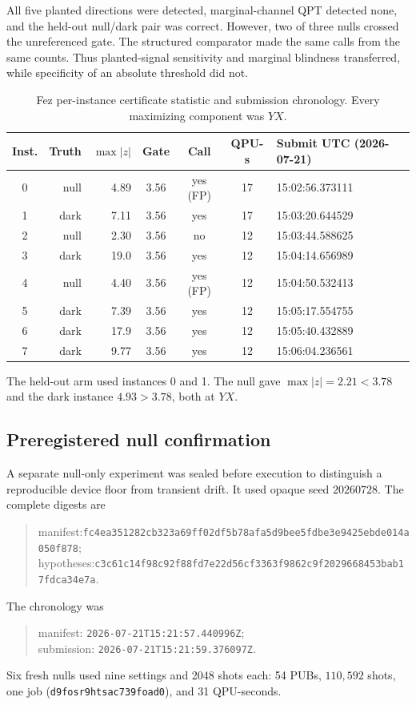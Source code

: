 \documentclass[aps,prl,onecolumn,superscriptaddress,nofootinbib]{revtex4-2}
\newcommand{\hashfour}[4]{\texttt{#1}\allowbreak\texttt{#2}\allowbreak\texttt{#3}\allowbreak\texttt{#4}}
\begin{document}
All five planted directions were detected, marginal-channel QPT detected none, and the held-out null/dark pair was correct.  However, two of three nulls crossed the unreferenced gate.  The structured comparator made the same calls from the same counts.  Thus planted-signal sensitivity and marginal blindness transferred, while specificity of an absolute threshold did not.

\begin{table}[t]
\caption{Fez per-instance certificate statistic and submission chronology.  Every maximizing component was $YX$.}
\label{tab:fez-instances}
\scriptsize
\begin{ruledtabular}
\begin{tabular}{crrcccl}
Inst. & Truth & $\max|z|$ & Gate & Call & QPU-s & Submit UTC (2026-07-21)\\
\hline
0 & null & 4.89 & 3.56 & yes (FP) & 17 & 15:02:56.373111\\
1 & dark & 7.11 & 3.56 & yes & 17 & 15:03:20.644529\\
2 & null & 2.30 & 3.56 & no & 12 & 15:03:44.588625\\
3 & dark & 19.0 & 3.56 & yes & 12 & 15:04:14.656989\\
4 & null & 4.40 & 3.56 & yes (FP) & 12 & 15:04:50.532413\\
5 & dark & 7.39 & 3.56 & yes & 12 & 15:05:17.554755\\
6 & dark & 17.9 & 3.56 & yes & 12 & 15:05:40.432889\\
7 & dark & 9.77 & 3.56 & yes & 12 & 15:06:04.236561\\
\end{tabular}
\end{ruledtabular}
\end{table}

The held-out arm used instances 0 and 1.  The null gave $\max|z|=2.21<3.78$ and the dark instance $4.93>3.78$, both at $YX$.

\subsection{Preregistered null confirmation}

A separate null-only experiment was sealed before execution to distinguish a reproducible device floor from transient drift.  It used opaque seed $20260728$.  The complete digests are
\begin{quote}\small\raggedright
manifest:\quad \hashfour{fc4ea351282cb323}{a69ff02df5b78afa}{5d9bee5fdbe3e942}{5ebde014a050f878};\\
hypotheses:\quad \hashfour{c3c61c14f98c92f}{88fd7e22d56cf336}{3f9862c9f2029668}{453bab17fdca34e7a}.
\end{quote}
The chronology was
\begin{quote}\small\raggedright
manifest: \texttt{2026-07-21}\allowbreak\texttt{T15:21:57.440996Z};\\
submission: \texttt{2026-07-21}\allowbreak\texttt{T15:21:59.376097Z}.
\end{quote}
Six fresh nulls used nine settings and 2048 shots each: 54 PUBs, $110{,}592$ shots, one job (\texttt{d9fosr9htsac739foad0}), and 31 QPU-seconds.
\end{document}
